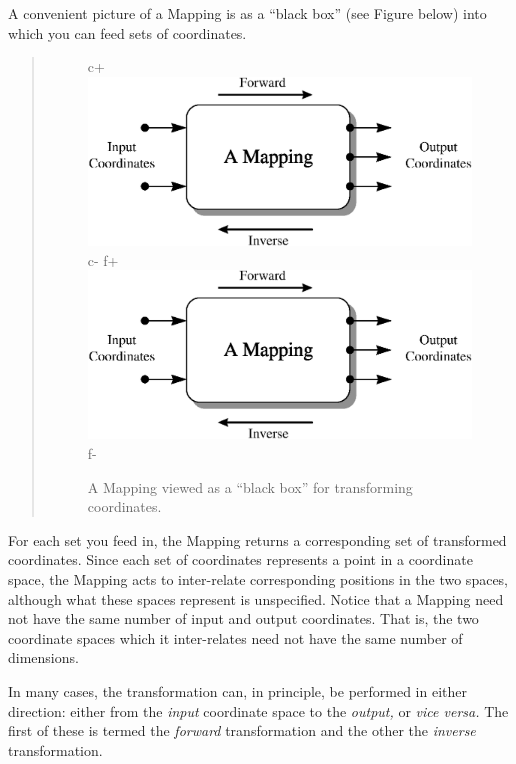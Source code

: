 \documentclass[twoside,11pt]{article}
\begin{document}
\begin{htmlonly}
   A convenient picture of a Mapping is as a ``black box'' (see Figure
   below) into which you can feed sets of coordinates.
   \begin{quote}
   \begin{figure}[bhtp]
   \label{fig:mapping}
c+
   \includegraphics[scale=1.2]{sun211_figures/mapping.eps}
c-
f+
   \includegraphics[scale=1.2]{sun210_figures/mapping.eps}
f-
   \caption{A Mapping viewed as a ``black box'' for transforming coordinates.}
   \end{figure}
   \end{quote}
\end{htmlonly}
For each set you feed in, the Mapping returns a corresponding set of
transformed coordinates. Since each set of coordinates represents a
point in a coordinate space, the Mapping acts to inter-relate
corresponding positions in the two spaces, although what these spaces
represent is unspecified.  Notice that a Mapping need not have the
same number of input and output coordinates. That is, the two
coordinate spaces which it inter-relates need not have the same number
of dimensions.

In many cases, the transformation can, in principle, be performed in
either direction: either from the {\em{input}} coordinate space to the
{\em{output,}} or {\em{vice versa.}} The first of these is termed the
{\em{forward}} transformation and the other the {\em{inverse}}
transformation.
\end{document}
